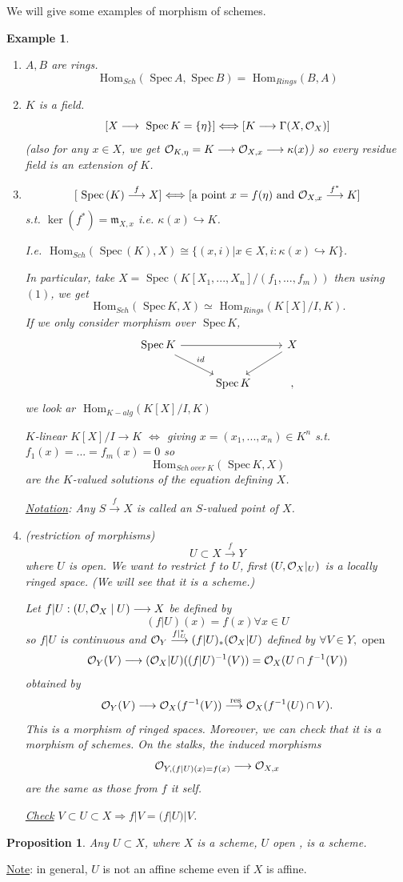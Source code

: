 \documentclass[11pt]{article}
\newtheorem{prop}[thm]{Proposition}
\newtheorem{ex}[thm]{Example}
\renewcommand{\hom}{\text{ Hom}}
\newcommand{\spec}{\text{ Spec}\,}
\newcommand{\res}{\text{ res}}
\newcommand{\scm}{{\mathfrak m}}
\newcommand{\calo}{{\cal O}}
\newcommand{\Lrta}{\Longrightarrow}
\newcommand{\lrta}{\longrightarrow}
\newcommand{\Llrta}{\Longleftrightarrow}
\newcommand{\inj}{\hookrightarrow}
\begin{document}
We will give some examples of morphism of schemes.
\begin{ex}\ 
\begin{enumerate}[label=(\arabic*)]
\item $A, B$ are rings. 
$$
\hom_{Sch}(\spec A,\spec B)=\hom_{Rings}(B,A)
$$
\item $K$ is a field.
$$
[X\lrta \spec K=\{\eta\}]\Llrta [K\lrta \Gamma(X,\calo_X)]
$$
(also for any $x\in X$, we get $\calo_{K,\eta}=K\lrta \calo_{X,x}\lrta \kappa(x)$) so every residue field is an extension of $K$.
\item $$
[\spec(K)\overset{f}{\lrta } X]\Llrta [\text{a point $x=f(\eta)$ and } \calo_{X,x}\overset{f^*}{\lrta } K]
$$
s.t. $\ker(f^*)=\scm_{X,x}$ i.e. $\kappa(x)\inj K$.

I.e. $\hom_{Sch}(\spec(K), X)\cong\{(x,i)|x\in X, i:\kappa(x)\inj K\}$. 

In particular, take $X=\spec(K[X_1,...,X_n]/(f_1,...,f_m))$ then using $(1)$, we get 
$$
\hom_{Sch}(\spec K, X)\simeq \hom_{Rings}(K[X]/I, K).
$$
If we only consider morphism over $\spec K$,
$$
\begin{tikzcd}
\spec K \arrow[rd, "id"] \arrow[rr] &  &X \arrow[ld] \\
 & \spec K & ,
\end{tikzcd}
$$
we look ar $\hom_{K-alg}(K[X]/I ,K)$

$K$-linear $K[X]/I\lrta K$ $\Llrta $ giving $x=(x_1,...,x_n)\in K^n$ s.t. $f_1(x)=...=f_m(x)=0$ so
$$
\hom_{Sch\ over\ K}(\spec K, X)
$$
are the $K$-valued solutions of the equation defining $X$.

\underline{Notation}: Any $S\overset{f}{\lrta }X$ is called an $S$-valued point of $X$.
\item  (restriction of morphisms)
$$
U\subset X\overset{f}{\lrta} Y
$$
where $U$ is open. We want to restrict $f$ to $U$, first $(U,\calo_X|_U)$ is a locally ringed space. (We will see that it is a scheme.)

Let $f|U:(U,\calo_X\mid U)\lrta X$ be defined by 
$$
(f|U)(x)=f(x)\forall x\in U
$$
so $f| U$ is continuous and 
$\calo_Y\overset{f|_U^*}{\lrta }(f|U)_*(\calo_X|U)$ defined by 
$
\forall V\in Y,\text{ open }
$
$$
\calo_Y(V)\lrta (\calo_X|U)((f|U)^{-1} (V))=\calo_X(U\cap f^{-1}(V))
$$
obtained by 
$$
\calo_Y(V)\lrta \calo_X(f^{-1}(V))\overset{\res}{\lrta}\calo_{X}(f^{-1}(U)\cap V).
$$
This is a morphism of ringed spaces. Moreover, we can check that it is a morphism of schemes. On the stalks, the induced morphisms 
$$
\calo_{Y,(f|U)(x)=f(x)}\lrta \calo_{X,x}
$$
are the same as those from $f$ it self. 

\underline{Check} $V\subset U\subset X\Lrta f|V=(f|U)|V$.
\end{enumerate}
\end{ex}
\begin{prop}\label{prop:open_subscheme} Any $U\subset X$, where $X$ is a scheme, $U$ open , is a scheme. 
\end{prop}
\underline{Note}: in general, $U$ is not an affine  scheme even if $X$ is affine.
\end{document}
